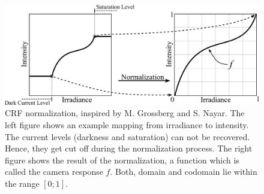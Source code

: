 \begin{figure}[bth]
	\centering
	\includegraphics[width=0.8\linewidth]{images/crf_normalization.pdf}
	\caption[CRF normalization]{CRF normalization, inspired by M. Grossberg and S. Nayar. The left figure shows an example mapping from irradiance to intensity. The current levels (darkness and saturation) can not be recovered. Hence, they get cut off during the normalization process. The right figure shows the result of the normalization, a function which is called the camera response $f$. Both, domain and codomain lie within the range $[0; 1]$.}
	\label{fig:crfnormalization}
\end{figure}